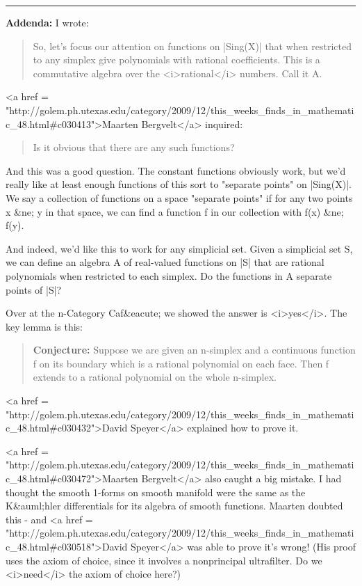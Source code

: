 \par\noindent\rule{\textwidth}{0.4pt}

\textbf{Addenda:}  I wrote:

\begin{quote}

So, let's focus our attention on functions on |Sing(X)| that when
restricted to any simplex give polynomials with rational coefficients.
This is a commutative algebra over the <i>rational</i> numbers.  Call
it A.

\end{quote}

<a href = "http://golem.ph.utexas.edu/category/2009/12/this_weeks_finds_in_mathematic_48.html#c030413">Maarten Bergvelt</a> inquired:

\begin{quote}

Is it obvious that there are any such functions?

\end{quote}

And this was a good question.  The constant functions obviously work,
but we'd really like at least enough functions of this sort to
"separate points" on |Sing(X)|.  We say a collection of
functions on a space "separate points" if for any two points
x &ne; y in that space, we can find a function f in our collection
with f(x) &ne; f(y).

And indeed, we'd like this to work for any simplicial set.  Given a simplicial
set S, we can define an algebra A of real-valued functions on |S| that
are rational polynomials when restricted to each simplex.  Do the functions
in A separate points of |S|?

Over at the n-Category Caf&eacute; we showed the answer is <i>yes</i>.
The key lemma is this:

\begin{quote}

   \textbf{Conjecture:} Suppose we are given an n-simplex and a continuous
   function f on its boundary which is a rational polynomial on each
   face.  Then f extends to a rational polynomial on the whole
   n-simplex.

\end{quote}

<a href = "http://golem.ph.utexas.edu/category/2009/12/this_weeks_finds_in_mathematic_48.html#c030432">David Speyer</a> explained how to prove it.

<a href =
"http://golem.ph.utexas.edu/category/2009/12/this_weeks_finds_in_mathematic_48.html#c030472">Maarten
Bergvelt</a> also caught a big mistake.  I had thought the smooth
1-forms on smooth manifold were the same as the K&auml;hler
differentials for its algebra of smooth functions.  Maarten doubted
this - and <a href =
"http://golem.ph.utexas.edu/category/2009/12/this_weeks_finds_in_mathematic_48.html#c030518">David
Speyer</a> was able to prove it's wrong!  (His proof uses the axiom of
choice, since it involves a nonprincipal ultrafilter.  Do we
<i>need</i> the axiom of choice here?)

